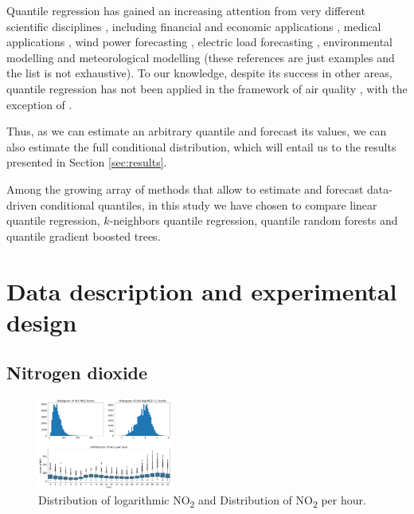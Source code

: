 \documentclass[a4paper,twocolumn,5p]{elsarticle}
\begin{document}
Quantile regression has gained an increasing attention from very
different scientific disciplines \cite{yu_quantile_2003}, including
financial and economic applications \cite{ben_rejeb_financial_2016},
medical applications \cite{jang_quantile_2018}, wind power
forecasting \cite{wan_direct_2017}, electric load forecasting
\cite{lebotsa_short_2018}, environmental modelling
\cite{cade_gentle_2003} and meteorological modelling
\cite{baur_modelling_2004} (these references are just
examples and the list is not exhaustive). To our knowledge, despite
its success in other areas, quantile regression has not been applied
in the framework of air quality , with the exception of
 \cite{martinezsilva_forecasting_2016}.

Thus, as we can estimate an arbitrary quantile and forecast its
values, we can also estimate the full conditional distribution, which
will entail us to the results presented in Section \ref{sec:results}.

Among the growing array of methods that allow to estimate and forecast
data-driven conditional quantiles, in this study we have chosen to
compare linear quantile regression, $k$-neighbors quantile regression,
quantile random forests and quantile gradient boosted trees.


\section{Data description and experimental design}

\subsection{Nitrogen dioxide}
\label{sec:no2}

\begin{figure}
  \centering
  \includegraphics[width=0.4\textwidth]{histo_variance}
  \caption{\label{figure:histo_variance}Distribution of logarithmic
    NO\textsubscript{2} and Distribution of NO\textsubscript{2}
    per hour.}
\end{figure}
\end{document}

